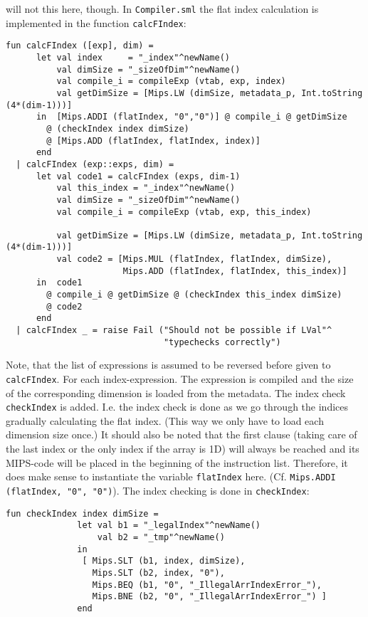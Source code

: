 \documentclass{article}
\begin{document}
will not this here, though. In \texttt{Compiler.sml} the flat index calculation is implemented
in the function \texttt{calcFIndex}:
\begin{lstlisting}
fun calcFIndex ([exp], dim) =
      let val index     = "_index"^newName()
          val dimSize = "_sizeOfDim"^newName()
          val compile_i = compileExp (vtab, exp, index)
          val getDimSize = [Mips.LW (dimSize, metadata_p, Int.toString (4*(dim-1)))]
      in  [Mips.ADDI (flatIndex, "0","0")] @ compile_i @ getDimSize
        @ (checkIndex index dimSize)
        @ [Mips.ADD (flatIndex, flatIndex, index)]
      end
  | calcFIndex (exp::exps, dim) =
      let val code1 = calcFIndex (exps, dim-1)
          val this_index = "_index"^newName()
          val dimSize = "_sizeOfDim"^newName()
          val compile_i = compileExp (vtab, exp, this_index)

          val getDimSize = [Mips.LW (dimSize, metadata_p, Int.toString (4*(dim-1)))]
          val code2 = [Mips.MUL (flatIndex, flatIndex, dimSize),
                       Mips.ADD (flatIndex, flatIndex, this_index)]
      in  code1
        @ compile_i @ getDimSize @ (checkIndex this_index dimSize)
        @ code2
      end
  | calcFIndex _ = raise Fail ("Should not be possible if LVal"^
                               "typechecks correctly")
\end{lstlisting}
Note, that the list of expressions is assumed to be reversed before given to \texttt{calcFIndex}.
For each index-expression. The expression is compiled and the size of the corresponding dimension
is loaded from the metadata. The index check \texttt{checkIndex} is added. I.e. the index check is
done as we go through the indices gradually calculating the flat index. (This way we only have to
load each dimension size once.) It should also be noted that the first clause (taking care of the
last index or the only index if the array is 1D) will always be reached and its MIPS-code will be
placed in the beginning of the instruction list. Therefore, it does make sense to instantiate the
variable \texttt{flatIndex} here. (Cf. \texttt{Mips.ADDI (flatIndex, "0", "0")}). The index checking
is done in \texttt{checkIndex}:
\begin{lstlisting}
fun checkIndex index dimSize =
              let val b1 = "_legalIndex"^newName()
                  val b2 = "_tmp"^newName()
              in
               [ Mips.SLT (b1, index, dimSize),
                 Mips.SLT (b2, index, "0"),
                 Mips.BEQ (b1, "0", "_IllegalArrIndexError_"),
                 Mips.BNE (b2, "0", "_IllegalArrIndexError_") ]
              end
\end{lstlisting}
\end{document}
